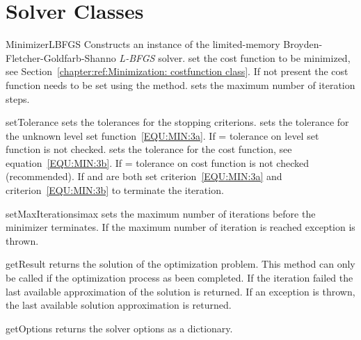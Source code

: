 \section{Solver Classes}

\begin{classdesc}{MinimizerLBFGS}{}
Constructs an instance of the limited-memory Broyden-Fletcher-Goldfarb-Shanno \emph{L-BFGS} solver.
 set the cost function to be minimized, see Section~\ref{chapter:ref:Minimization: costfunction class}. 
If not present the cost function needs to be set using the  method.
 sets the maximum number of iteration steps.
\end{classdesc}

\begin{methoddesc}[MinimizerLBFGS]{setTolerance}{ }
sets the tolerances for the stopping criterions. 
 sets the tolerance for the unknown level set function~\ref{EQU:MIN:3a}. If =\None 
tolerance on  level set function is not checked.
 sets the tolerance for the cost function, see equation~\ref{EQU:MIN:3b}.
If  = \None
tolerance on cost function is not checked (recommended). If  and  are both set
criterion~\ref{EQU:MIN:3a} and criterion~\ref{EQU:MIN:3b} to terminate the iteration.
\end{methoddesc}


\begin{methoddesc}[MinimizerLBFGS]{setMaxIterations}{imax}
sets the maximum number of iterations before the minimizer terminates. If 
the maximum number of iteration is reached  exception is thrown.
\end{methoddesc}

\begin{methoddesc}[MinimizerLBFGS]{getResult}{}
returns the solution of the optimization problem.
This method can only be called if the optimization process as been completed.
If the iteration failed the last available approximation of the solution is returned.
If an exception is thrown, the last available solution approximation is returned.
\end{methoddesc}

\begin{methoddesc}[MinimizerLBFGS]{getOptions}{}
returns the solver options as a dictionary.
\end{methoddesc}

